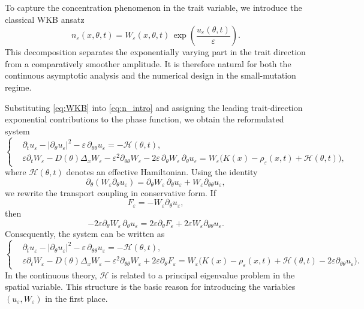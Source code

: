 \documentclass[11pt]{article}
\begin{document}
To capture the concentration phenomenon in the trait variable, we introduce the classical WKB ansatz
\begin{equation}\label{eq:WKB}
   n_\varepsilon(x,\theta,t)
   = W_\varepsilon(x,\theta,t)\,
   \exp\!\left(\frac{u_\varepsilon(\theta,t)}{\varepsilon}\right).
\end{equation}
This decomposition separates the exponentially varying part in the trait direction from a comparatively smoother amplitude. It is therefore natural for both the continuous asymptotic analysis and the numerical design in the small-mutation regime.

Substituting \eqref{eq:WKB} into \eqref{eq:n_intro} and assigning the leading trait-direction exponential contributions to the phase function, we obtain the reformulated system
\begin{equation}\label{eq:WKB_reformulation0}
\left\{
\begin{aligned}
& \partial_t u_\varepsilon
- |\partial_\theta u_\varepsilon|^2
- \varepsilon \, \partial_{\theta\theta} u_\varepsilon
= - \mathcal H(\theta,t), \\
& \varepsilon \partial_t W_\varepsilon
- D(\theta)\Delta_x W_\varepsilon
- \varepsilon^2 \partial_{\theta\theta} W_\varepsilon
- 2\varepsilon \, \partial_\theta W_\varepsilon \, \partial_\theta u_\varepsilon
= W_\varepsilon\bigl(K(x)-\rho_\varepsilon(x,t)+\mathcal H(\theta,t)\bigr),
\end{aligned}
\right.
\end{equation}
where \(\mathcal H(\theta,t)\) denotes an effective Hamiltonian. 
Using the identity
\[
\partial_\theta(W_\varepsilon\partial_\theta u_\varepsilon)
=
\partial_\theta W_\varepsilon\,\partial_\theta u_\varepsilon
+
W_\varepsilon\partial_{\theta\theta}u_\varepsilon,
\]
we rewrite the transport coupling in conservative form. If
\begin{equation}\label{def:F}
F_\varepsilon=-W_\varepsilon\partial_\theta u_\varepsilon,
\end{equation}
then
\[
-2\varepsilon\partial_\theta W_\varepsilon\,\partial_\theta u_\varepsilon
=
2\varepsilon\partial_\theta F_\varepsilon
+
2\varepsilon W_\varepsilon\partial_{\theta\theta}u_\varepsilon .
\]
Consequently, the system can be written as
\begin{equation}\label{eq:WKB_reformulation}
\left\{
\begin{aligned}
& \partial_t u_\varepsilon
- |\partial_\theta u_\varepsilon|^2
- \varepsilon \, \partial_{\theta\theta} u_\varepsilon
= - \mathcal H(\theta,t), \\
& \varepsilon \partial_t W_\varepsilon
- D(\theta)\Delta_x W_\varepsilon
- \varepsilon^2 \partial_{\theta\theta} W_\varepsilon
+2\varepsilon\partial_\theta F_\varepsilon
=
W_\varepsilon
\bigl(
K(x)-\rho_\varepsilon(x,t)
+\mathcal H(\theta,t)
-2\varepsilon\partial_{\theta\theta}u_\varepsilon
\bigr).
\end{aligned}
\right.
\end{equation}
In the continuous theory, \(\mathcal H\) is related to a principal eigenvalue problem in the spatial variable. This structure is the basic reason for introducing the variables \((u_\varepsilon,W_\varepsilon)\) in the first place.
\end{document}
